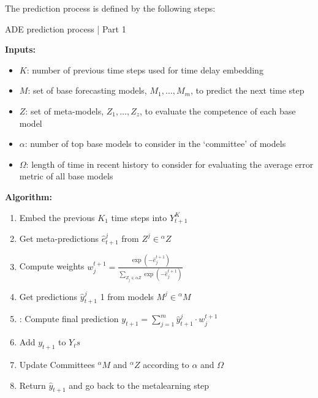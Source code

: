 The prediction process is defined by the following steps: 
\begin{tcolorbox}[colback=blue!5, colframe=blue!80, boxrule=0pt]
    \begin{algorithm} [H]
        \caption{ADE prediction process | Part 1
        }
        \label{alg:ADE}
        \textbf{Inputs:}
        \begin{itemize}
            \item $K$: number of previous time steps used for time delay embedding
            \item $M$: set of base forecasting models, $M_1, \dots, M_m$, to predict the next time step
            \item $Z$: set of meta-models, $Z_1, \dots, Z_z$, to evaluate the competence of each base model
            \item $\alpha$: number of top base models to consider in the ‘committee’ of models
            \item $\Omega$: length of time in recent history to consider for evaluating the average error metric of all base models
        \end{itemize}
        \textbf{Algorithm:}
        \begin{enumerate}
            \item Embed the previous $K_1$ time steps into $Y_{t+1}^K$
            \item Get meta-predictions $\hat{e}_{t+1}^j$ from $Z^j \in {}^\alpha Z$
            \item Compute weights $w_{j}^{t+1} = \frac{\exp(-\hat{e}_{j}^{t+1})}{\sum_{Z_j \in \alpha Z} \exp(-\hat{e}_{j}^{t+1})}$
            \item Get predictions $\hat{y}_{t+1}^j$ 1 from models $M^j \in {}^\alpha M$
            \item : Compute final prediction $y_{t+1} = \sum_{j=1}^{m} \hat{y}^{j}_{t+1} \cdot w_{j}^{t+1}$
            \item Add $y_{t+1}$ to $Y_ts$
            \item Update Committees ${}^\alpha M$ and ${}^\alpha Z$ according to $\alpha$ and $\Omega$
            \item Return $\hat{y}_{t+1}$ and go back to the metalearning step 
        \end{enumerate}
    \end{algorithm}
\end{tcolorbox}


